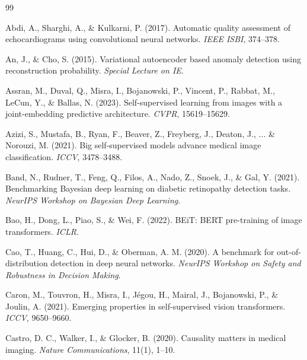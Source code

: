 \documentclass[11pt,a4paper]{article}
\begin{document}

\begin{thebibliography}{99}

Abdi, A., Sharghi, A., \& Kulkarni, P. (2017). 
Automatic quality assessment of echocardiograms using convolutional neural networks.
\textit{IEEE ISBI}, 374--378.

An, J., \& Cho, S. (2015).
Variational autoencoder based anomaly detection using reconstruction probability.
\textit{Special Lecture on IE}.

Assran, M., Duval, Q., Misra, I., Bojanowski, P., Vincent, P., Rabbat, M., LeCun, Y., \& Ballas, N. (2023).
Self-supervised learning from images with a joint-embedding predictive architecture.
\textit{CVPR}, 15619--15629.

Azizi, S., Mustafa, B., Ryan, F., Beaver, Z., Freyberg, J., Deaton, J., ... \& Norouzi, M. (2021).
Big self-supervised models advance medical image classification.
\textit{ICCV}, 3478--3488.

Band, N., Rudner, T., Feng, Q., Filos, A., Nado, Z., Snoek, J., \& Gal, Y. (2021).
Benchmarking Bayesian deep learning on diabetic retinopathy detection tasks.
\textit{NeurIPS Workshop on Bayesian Deep Learning}.

Bao, H., Dong, L., Piao, S., \& Wei, F. (2022).
BEiT: BERT pre-training of image transformers.
\textit{ICLR}.

Cao, T., Huang, C., Hui, D., \& Oberman, A. M. (2020).
A benchmark for out-of-distribution detection in deep neural networks.
\textit{NeurIPS Workshop on Safety and Robustness in Decision Making}.

Caron, M., Touvron, H., Misra, I., J\'{e}gou, H., Mairal, J., Bojanowski, P., \& Joulin, A. (2021).
Emerging properties in self-supervised vision transformers.
\textit{ICCV}, 9650--9660.

Castro, D. C., Walker, I., \& Glocker, B. (2020).
Causality matters in medical imaging.
\textit{Nature Communications}, 11(1), 1--10.


\end{thebibliography}
\end{document}
